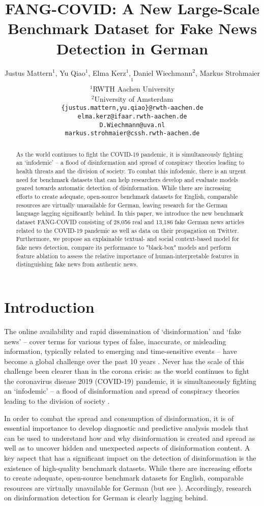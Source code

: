 \documentclass[11pt]{article}
\title{FANG-COVID: A New Large-Scale Benchmark Dataset for Fake News Detection in German}
\author{Justus Mattern$^1$, Yu Qiao$^1$, Elma Kerz$^1$, Daniel Wiechmann$^2$, Markus Strohmaier$^1$ \\
         $^1$RWTH Aachen University \\ $^2$University of Amsterdam\\
         \texttt{\{justus.mattern,yu.qiao\}@rwth-aachen.de}\\
         \texttt{elma.kerz@ifaar.rwth-aachen.de}\\
         \texttt{D.Wiechmann@uva.nl}\\
         \texttt{markus.strohmaier@cssh.rwth-aachen.de}}
\begin{document}
\maketitle



\begin{abstract}
As the world continues to fight the COVID-19 pandemic, it is simultaneously fighting an ‘infodemic' -- a flood of disinformation and spread of conspiracy theories leading to health threats and the division of society. To combat this infodemic, there is an urgent need for benchmark datasets that can help researchers develop and evaluate models geared towards automatic detection of disinformation. While there are increasing efforts to create adequate, open-source benchmark datasets for English, comparable resources are virtually unavailable for German, leaving research for the German language lagging significantly behind. In this paper, we introduce the new benchmark dataset FANG-COVID consisting of 28,056 real and 13,186 fake German news articles related to the COVID-19 pandemic as well as data on their propagation on Twitter. Furthermore, we propose an explainable textual- and social context-based model for fake news detection, compare its performance to "black-box" models and perform feature ablation to assess the relative importance of human-interpretable features in distinguishing fake news from authentic news.


\end{abstract}



\section{Introduction}

The online availability and rapid dissemination of `disinformation' and `fake news' – cover terms for various types of false, inaccurate, or misleading information, typically related to emerging and time-sensitive events – have become a global challenge over the past 10 years \citep{tucker2018social}. Never has the scale of this challenge been clearer than in the corona crisis: as the world continues to fight the coronavirus disease 2019 (COVID-19) pandemic, it is simultaneously fighting an `infodemic' -- a flood of disinformation and spread of conspiracy theories leading to the division of society \citep{orso2020infodemic,solomon2020infodemic}.

In order to combat the spread and consumption of disinformation, it is of essential importance to develop diagnostic and predictive analysis models that can be used to understand how and why disinformation is created and spread as well as to uncover hidden and unexpected aspects of disinformation content. A key aspect that has a significant impact on the detection of disinformation is the existence of high-quality benchmark datasets. While there are increasing efforts to create adequate, open-source benchmark datasets for English, comparable resources are virtually unavailable for German (but see \citet{vogel2019fake}). Accordingly, research on disinformation detection for German is clearly lagging behind. 
\end{document}
